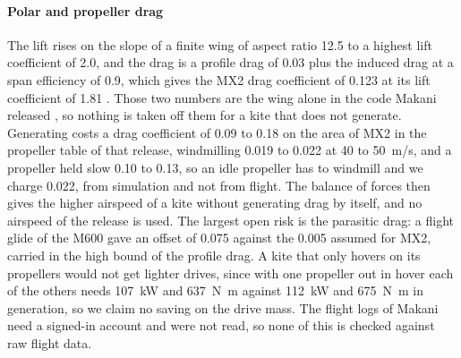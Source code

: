 \paragraph{Polar and propeller drag} The lift rises on the slope of a finite wing of aspect ratio 12.5 to a highest lift coefficient of 2.0, and the drag is a profile drag of 0.03 plus the induced drag at a span efficiency of 0.9, which gives the MX2 drag coefficient of 0.123 at its lift coefficient of 1.81 \citep{echeverri2020part1}. Those two numbers are the wing alone in the code Makani released \citep{makani2020code}, so nothing is taken off them for a kite that does not generate. Generating costs a drag coefficient of 0.09 to 0.18 on the area of MX2 in the propeller table of that release, windmilling 0.019 to 0.022 at 40 to \SI{50}{m/s}, and a propeller held slow 0.10 to 0.13, so an idle propeller has to windmill and we charge 0.022, from simulation and not from flight. The balance of forces then gives the higher airspeed of a kite without generating drag by itself, and no airspeed of the release is used. The largest open risk is the parasitic drag: a flight glide of the M600 gave an offset of 0.075 against the 0.005 assumed for MX2, carried in the high bound of the profile drag. A kite that only hovers on its propellers would not get lighter drives, since with one propeller out in hover each of the others needs 107~kW and \SI{637}{N.m} against 112~kW and \SI{675}{N.m} in generation, so we claim no saving on the drive mass. The flight logs of Makani need a signed-in account and were not read, so none of this is checked against raw flight data.

